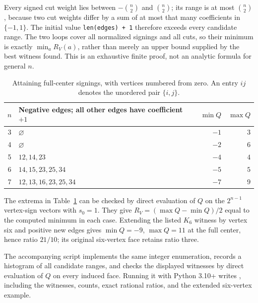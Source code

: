 Every signed cut weight lies between $-\binom n2$ and $\binom n2$;
its range is at most $\binom n2$, because two cut weights differ by a
sum of at most that many coefficients in $\{-1,1\}$. The initial value
\texttt{len(edges) + 1} therefore exceeds every candidate range. The two
loops cover all normalized signings and all cuts, so their minimum is
exactly $\min_a R_V(a)$, rather than merely an upper bound supplied by
the best witness found. This is an exhaustive finite proof, not an
analytic formula for general $n$.

\begin{table}[htbp]
\centering
\begin{tabular}{clrr}
\toprule
$n$ & Negative edges; all other edges have coefficient $+1$
    & $\min Q$ & $\max Q$\\
\midrule
3 & $\varnothing$ & $-1$ & $3$\\
4 & $\varnothing$ & $-2$ & $6$\\
5 & $12,14,23$ & $-4$ & $4$\\
6 & $14,15,23,25,34$ & $-5$ & $5$\\
7 & $12,13,16,23,25,34$ & $-7$ & $9$\\
\bottomrule
\end{tabular}
\caption{Attaining full-center signings, with vertices numbered from zero.
An entry $ij$ denotes the unordered pair $\{i,j\}$.}
\label{tab:finite-witnesses}
\end{table}

The extrema in Table~\ref{tab:finite-witnesses} can be checked by direct
evaluation of $Q$ on the $2^{n-1}$ vertex-sign vectors with $s_0=1$.
They give $R_V=(\max Q-\min Q)/2$ equal to the computed minimum in each
case. Extending the listed $K_6$ witness by vertex six and positive new
edges gives $\min Q=-9$, $\max Q=11$ at the full center, hence ratio
$21/10$; its original six-vertex face retains ratio three.

The accompanying script 
implements the same integer enumeration, records a histogram of all
candidate ranges, and checks the displayed witnesses by direct evaluation
of $Q$ on every induced face. Running it with Python 3.10+ writes
, including the witnesses,
counts, exact rational ratios, and the extended six-vertex example.
